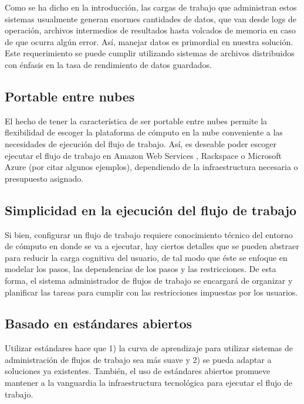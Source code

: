 Como se ha dicho en la introducción, las cargas de trabajo que administran estos sistemas usualmente generan enormes cantidades de datos, que van desde logs de operación, archivos intermedios de resultados hasta volcados de memoria en caso de que ocurra algún error. Así, manejar datos es primordial en nuestra solución. Este requerimiento se puede cumplir utilizando sistemas de archivos distribuidos con énfasis en la tasa de rendimiento de datos guardados.


\subsection{Portable entre nubes}

El hecho de tener la característica de ser portable entre nubes permite la flexibilidad de escoger la plataforma de cómputo en la nube conveniente a las necesidades de ejecución del flujo de trabajo. Así, es deseable poder escoger ejecutar el flujo de trabajo en Amazon Web Services \cite{amazon2016aws}, Rackspace \cite{racksapce2016managedcloud} o Microsoft Azure \cite{microsoft2015azure} (por citar algunos ejemplos), dependiendo de la infraestructura necesaria o presupuesto asignado.


\subsection{Simplicidad en la ejecuci\'on del flujo de trabajo}

Si bien, configurar un flujo de trabajo requiere conocimiento técnico del entorno de cómputo en donde se va a ejecutar, hay ciertos detalles que se pueden abstraer para reducir la carga cognitiva del usuario, de tal modo que éste se enfoque en modelar los pasos, las dependencias de los pasos y las restricciones. De esta forma, el sistema administrador de flujos de trabajo se encargará de organizar y planificar las tareas para cumplir con las restricciones impuestas por los usuarios.


\subsection{Basado en estándares abiertos}

Utilizar estándares hace que 1) la curva de aprendizaje para utilizar sistemas de administración de flujos de trabajo sea más suave y 2) se pueda adaptar a soluciones ya existentes. También, el uso de estándares abiertos promueve mantener a la vanguardia la infraestructura tecnológica para ejecutar el flujo de trabajo.


